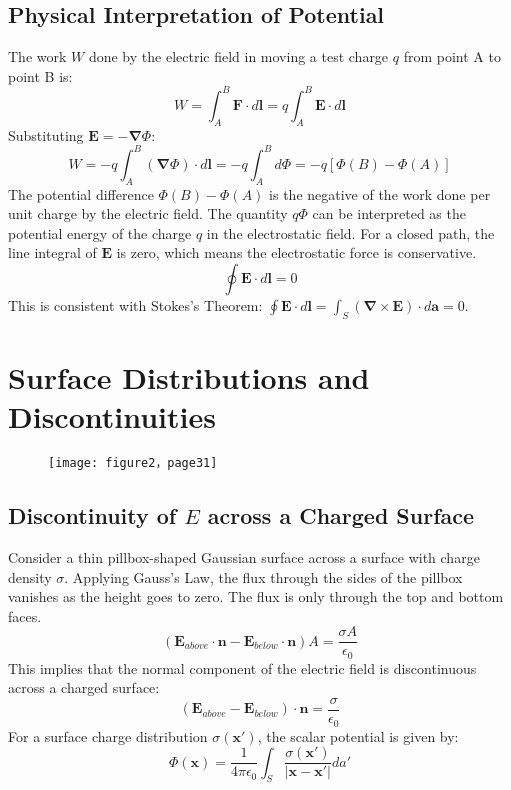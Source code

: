 \documentclass[12pt, a4paper]{article}
\begin{document}
	\subsection{Physical Interpretation of Potential}
	The work $W$ done by the electric field in moving a test charge $q$ from point A to point B is:
	\begin{equation}
		W = \int_A^B \bm{F} \cdot d\bm{l} = q \int_A^B \bm{E} \cdot d\bm{l}
	\end{equation}
	Substituting $\bm{E} = -\bm{\nabla}\Phi$:
	\begin{equation}
		W = -q \int_A^B (\bm{\nabla}\Phi) \cdot d\bm{l} = -q \int_A^B d\Phi = -q[\Phi(B) - \Phi(A)]
	\end{equation}
	The potential difference $\Phi(B) - \Phi(A)$ is the negative of the work done per unit charge by the electric field. The quantity $q\Phi$ can be interpreted as the potential energy of the charge $q$ in the electrostatic field. For a closed path, the line integral of $\bm{E}$ is zero, which means the electrostatic force is conservative.
	\begin{equation}
		\oint \bm{E} \cdot d\bm{l} = 0
	\end{equation}
	This is consistent with Stokes's Theorem: $\oint \bm{E} \cdot d\bm{l} = \int_S (\bm{\nabla} \times \bm{E}) \cdot d\bm{a} = 0$.
	
	\section{Surface Distributions and Discontinuities}
	
    \begin{figure}[h]
	    \centering
     	\texttt{[image: figure2，page31]}
    	\caption{}
	    \label{fig:figure2page31}
    \end{figure}
	\subsection{Discontinuity of $E$ across a Charged Surface}
	Consider a thin pillbox-shaped Gaussian surface across a surface with charge density $\sigma$. Applying Gauss's Law, the flux through the sides of the pillbox vanishes as the height goes to zero. The flux is only through the top and bottom faces.
	\begin{equation}
		(\bm{E}_{above} \cdot \bm{n} - \bm{E}_{below} \cdot \bm{n}) A = \frac{\sigma A}{\epsilon_0}
	\end{equation}
	This implies that the normal component of the electric field is discontinuous across a charged surface:
	\begin{equation}
		(\bm{E}_{above} - \bm{E}_{below}) \cdot \bm{n} = \frac{\sigma}{\epsilon_0}
	\end{equation}
	For a surface charge distribution $\sigma(\bm{x}')$, the scalar potential is given by:
	\begin{equation}
		\Phi(\bm{x}) = \frac{1}{4\pi\epsilon_0} \int_S \frac{\sigma(\bm{x}')}{|\bm{x}-\bm{x}'|} da'
	\end{equation}
	
\end{document}

